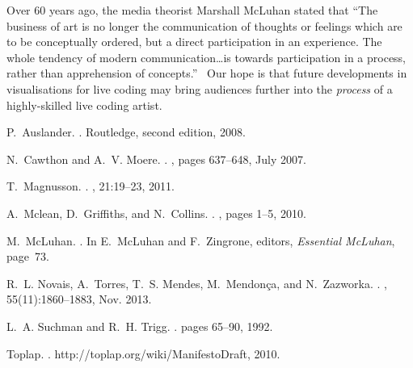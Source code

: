 \documentclass{sig-alternate}
\begin{document}
Over 60 years ago, the media theorist Marshall McLuhan stated that
``The business of art is no longer the communication of thoughts or
feelings which are to be conceptually ordered, but a direct
participation in an experience. The whole tendency of modern
communication\ldots is towards participation in a process, rather than
apprehension of concepts.''~\cite{McLuhan} Our hope is that future
developments in visualisations for live coding may bring audiences
further into the \emph{process} of a highly-skilled live coding
artist.



\begin{thebibliography}{1}

P.~Auslander.
.
\newblock Routledge, second edition, 2008.

N.~Cawthon and A.~V. Moere.
.
, pages 637--648, July 2007.

T.~Magnusson.
.
, 21:19--23, 2011.

A.~Mclean, D.~Griffiths, and N.~Collins.
.
, pages 1--5, 2010.

M.~McLuhan.
.
\newblock In E.~McLuhan and F.~Zingrone, editors, {\em Essential McLuhan},
  page~73.

R.~L. Novais, A.~Torres, T.~S. Mendes, M.~Mendon\c{c}a, and N.~Zazworka.
.
, 55(11):1860--1883, Nov.
  2013.

L.~A. Suchman and R.~H. Trigg.
.
\newblock pages 65--90, 1992.

Toplap.
.
\newblock http://toplap.org/wiki/ManifestoDraft, 2010.

\end{thebibliography}
\end{document}
